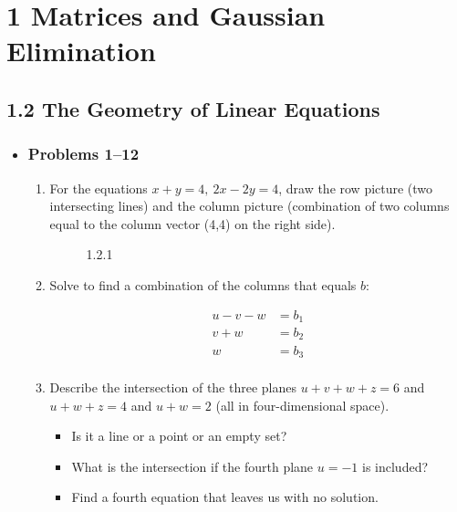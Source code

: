 \chapter{1 Matrices and Gaussian Elimination}

\section{1.2 The Geometry of Linear Equations}
\begin{itemize}
  \item []

  \subsection{Problems 1--12}
  \begin{enumerate}
    \item For the equations \( x + y = 4, ~ 2x - 2y = 4 \), draw the row picture (two
      intersecting lines) and the column picture (combination of two columns
      equal to the column vector (4,4) on the right side).

      \begin{figure}[ht]
          \centering
          \caption{1.2.1}
      \end{figure}

    \item Solve to find a combination of the columns that equals \(b\):

      \begin{align*}
        u - v - w &= b_1 \\
        v + w &= b_2 \\
        w &= b_3 \\
      \end{align*}

    \item Describe the intersection of the three planes \(  u+v+w+z = 6 \) and
      \( u+w+z = 4 \) and \( u+w = 2 \) (all in four-dimensional space).
      \begin{itemize}
        \item Is it a line or a point or an empty set?
        \item What is the intersection if the fourth plane \( u = −1 \) is included?
        \item Find a fourth equation that leaves us with no solution.
      \end{itemize}

  \end{enumerate}


\end{itemize}
